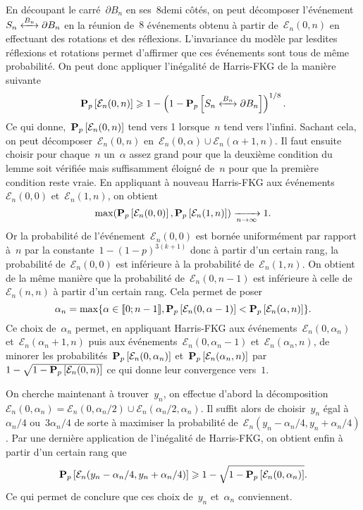 	\begin{dem}
		En découpant le carré~$\partial B_n$ en ses~$8$demi côtés, on peut décomposer l'événement~$\relie[B_n]{S_n}{\partial B_n}$ en la réunion de~$8$ événements obtenu à partir de~$\mathcal{E}_n(0, n)$ en effectuant des rotations et des réflexions. L'invariance du modèle par lesdites réflexions et rotations permet d'affirmer que ces événements sont tous de même probabilité. On peut donc appliquer l'inégalité de Harris-FKG de la manière suivante
		\[
			\Pp{\mathcal{E}_n(0,n)} \geq 1 - \left(1 - \Pp{\relie[B_n]{S_n}{\partial B_n}} \right)^{1/8}.
		\]
		Ce qui donne,~$\bm{\mathrm{P}}_{p}\left[\mathcal{E}_n(0, n)\right]$ tend vers 1 lorsque~$n$ tend vers l'infini. Sachant cela, on peut décomposer~$\mathcal{E}_n(0, n)$ en~$\mathcal{E}_n(0, \alpha) \cup \mathcal{E}_n(\alpha + 1, n)$. Il faut ensuite choisir pour chaque~$n$ un~$\alpha$ assez grand pour que la deuxième condition du lemme soit vérifiée mais suffisamment éloigné de~$n$ pour que la première condition reste vraie. En appliquant à nouveau Harris-FKG aux événements~$\mathcal{E}_n(0, 0)$ et~$\mathcal{E}_n(1, n)$, on obtient
		\[
			\max(\bm{\mathrm{P}}_{p}\left[\mathcal{E}_n(0, 0)\right], \bm{\mathrm{P}}_{p}\left[\mathcal{E}_n(1, n)\right]) \xrightarrow[n \to \infty]{} 1.
		\]
		Or la probabilité de l'événement~$\mathcal{E}_n(0,0)$ est bornée uniformément par rapport à~$n$ par la constante~$1 - (1-p)^{3(k+1)}$ donc à partir d'un certain rang, la probabilité de~$\mathcal{E}_n(0,0)$ est inférieure à la probabilité de~$\mathcal{E}_n(1, n)$. On obtient de la même manière que la probabilité de~$\mathcal{E}_n(0, n-1)$ est inférieure à celle de~$\mathcal{E}_n(n, n)$ à partir d'un certain rang. Cela permet de poser
		\[
			\alpha_n = \max \{ \alpha \in \llbracket 0;n-1 \rrbracket, \bm{\mathrm{P}}_{p}\left[\mathcal{E}_n(0, \alpha - 1)\right] < \bm{\mathrm{P}}_{p}\left[\mathcal{E}_n(\alpha, n)\right] \}.
		\]
		Ce choix de~$\alpha_n$ permet, en appliquant Harris-FKG aux événements~$\mathcal{E}_n(0, \alpha_n)$ et~$\mathcal{E}_n(\alpha_n + 1, n)$ puis aux événements~$\mathcal{E}_n(0, \alpha_n - 1)$ et~$\mathcal{E}_n(\alpha_n, n)$, de minorer les probabilités~$\bm{\mathrm{P}}_{p}\left[\mathcal{E}_n(0, \alpha_n)\right]$ et~$\bm{\mathrm{P}}_{p}\left[\mathcal{E}_n(\alpha_n, n)\right]$ par~$1 - \sqrt{1  - \bm{\mathrm{P}}_{p}\left[\mathcal{E}_n(0, n)\right]}$ ce qui donne leur convergence vers~$1$. 

		On cherche maintenant à trouver~$y_n$, on effectue d'abord la décomposition~$\mathcal{E}_n(0, \alpha_n) = \mathcal{E}_n(0, \alpha_n/2) \cup \mathcal{E}_n(\alpha_n/2, \alpha_n)$. Il suffit alors de choisir~$y_n$ égal à $\alpha_n/4$ ou~$3\alpha_n/4$ de sorte à maximiser la probabilité de~$\mathcal{E}_n(y_n - \alpha_n/4, y_n + \alpha_n/4)$. Par une dernière application de l'inégalité de Harris-FKG, on obtient enfin à partir d'un certain rang que
		\[
			\bm{\mathrm{P}}_{p}\left[\mathcal{E}_n(y_n - \alpha_n/4, y_n + \alpha_n/4)\right] \geqslant 1 - \sqrt{1 - \bm{\mathrm{P}}_{p}\left[\mathcal{E}_n(0, \alpha_n)\right]}.
		\]
		Ce qui permet de conclure que ces choix de~$y_n$ et~$\alpha_n$ conviennent.
	\end{dem}

